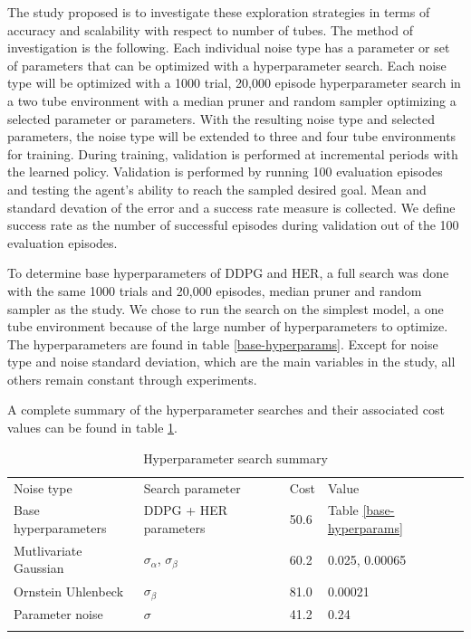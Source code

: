 The study proposed is to investigate these exploration strategies in terms of accuracy and scalability with respect to number of tubes. The method of investigation is the following. Each individual noise type has a parameter or set of parameters that can be optimized with a hyperparameter search. Each noise type will be optimized with a 1000 trial, 20,000 episode hyperparameter search in a two tube environment with a median pruner and random sampler optimizing a selected parameter or parameters. With the resulting noise type and selected parameters, the noise type will be extended to three and four tube environments for training. During training, validation is performed at incremental periods with the learned policy. Validation is performed by running 100 evaluation episodes and testing the agent's ability to reach the sampled desired goal. Mean and standard devation of the error and a success rate measure is collected. We define success rate as the number of successful episodes during validation out of the 100 evaluation episodes.

To determine base hyperparameters of DDPG and HER, a full search was done with the same 1000 trials and 20,000 episodes, median pruner and random sampler as the study. We chose to run the search on the simplest model, a one tube environment because of the large number of hyperparameters to optimize. The hyperparameters are found in table \ref{base-hyperparams}. Except for noise type and noise standard deviation, which are the main variables in the study, all others remain constant through experiments.

A complete summary of the hyperparameter searches and their associated cost values can be found in table \ref{hyperparam-summary}.

\begin{table}
\begin{tabular}{llll}
\hline\noalign{\smallskip}
Noise type & Search parameter & Cost & Value \\
\noalign{\smallskip}\hline\noalign{\smallskip}
Base hyperparameters & DDPG + HER parameters & 50.6 & Table \ref{base-hyperparams} \\
Mutlivariate Gaussian & $\sigma_\alpha$, $\sigma_\beta$ & 60.2 & 0.025, 0.00065 \\
Ornstein Uhlenbeck & $\sigma_\beta$ & 81.0 & 0.00021 \\
Parameter noise & $\sigma$ & 41.2 & 0.24 \\
\noalign{\smallskip}\hline
\end{tabular}
\caption{Hyperparameter search summary}
\label{hyperparam-summary} 
\end{table}

